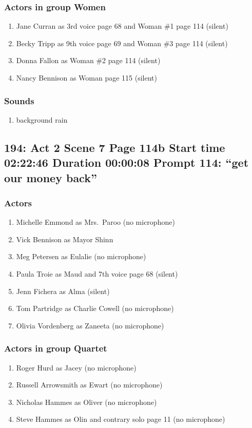 \subsubsection{Actors in group Women}
\begin{enumerate}
\item Jane Curran as 3rd voice page 68 and Woman \#1 page 114 (silent)
\item Becky Tripp as 9th voice page 69 and Woman \#3 page 114 (silent)
\item Donna Fallon as Woman \#2 page 114 (silent)
\item Nancy Bennison as Woman page 115 (silent)
\end{enumerate}

\subsubsection{Sounds}
\begin{enumerate}
\item background rain
\end{enumerate}
\subsection{194: Act 2 Scene 7 Page 114b Start time 02:22:46 Duration 00:00:08 Prompt 114: ``get our money back''}

\subsubsection{Actors}
\begin{enumerate}
\item Michelle Emmond as Mrs.~Paroo (no microphone)
\item Vick Bennison as Mayor Shinn
\item Meg Petersen as Eulalie (no microphone)
\item Paula Troie as Maud and 7th voice page 68 (silent)
\item Jenn Fichera as Alma (silent)
\item Tom Partridge as Charlie Cowell (no microphone)
\item Olivia Vordenberg as Zaneeta (no microphone)
\end{enumerate}
\subsubsection{Actors in group Quartet}
\begin{enumerate}
\item Roger Hurd as Jacey (no microphone)
\item Russell Arrowsmith as Ewart (no microphone)
\item Nicholas Hammes as Oliver (no microphone)
\item Steve Hammes as Olin and contrary solo page 11 (no microphone)
\end{enumerate}
